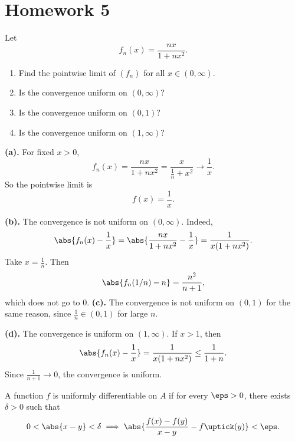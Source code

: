 
\section{Homework 5}

\begin{problem}[Exercise 6.2.1]{
    Let
    \[
        f_n(x)=\frac{nx}{1+nx^2}.
    \]
    \begin{enumerate}[label={(\alph*)}]
	\item Find the pointwise limit of $(f_n)$ for all $x\in(0,\infty)$.
    \item Is the convergence uniform on $(0,\infty)$?
    \item Is the convergence uniform on $(0,1)$?
    \item Is the convergence uniform on $(1,\infty)$?
    \end{enumerate}
}
    \textbf{(a).}
    For fixed $x>0$,
    \[
        f_n(x)=\frac{nx}{1+nx^2}
        =
        \frac{x}{\frac1n+x^2}
        \to \frac{1}{x}.
    \]
    So the pointwise limit is
    \[
        f(x)=\frac1x.
    \]

    \textbf{(b).}
    The convergence is not uniform on $(0,\infty)$.
    Indeed,
    \[
        \abs{f_n(x)-\frac1x}
        =
        \abs{\frac{nx}{1+nx^2}-\frac1x}
        =
        \frac{1}{x(1+nx^2)}.
    \]
    Take $x=\frac1n$.
    Then
    \[
        \abs{f_n(1/n)-n}
        =
        \frac{n^2}{n+1},
    \]
    which does not go to $0$.
    \textbf{(c).}
    The convergence is not uniform on $(0,1)$ for the same reason, since $\frac1n\in(0,1)$ for large $n$.

    \textbf{(d).}
    The convergence is uniform on $(1,\infty)$.
    If $x>1$, then
    \[
        \abs{f_n(x)-\frac1x}
        =
        \frac{1}{x(1+nx^2)}
        \leq
        \frac{1}{1+n}.
    \]
    Since $\frac{1}{n+1}\to 0$, the convergence is uniform.
\end{problem}

\begin{definition}
    A function $f$ is uniformly differentiable on $A$ if for every $\eps > 0$, there exists $\delta > 0$ such that
    \[
        0<\abs{x-y}<\delta
        \implies
        \abs{\frac{f(x)-f(y)}{x-y}-f\uptick(y)}<\eps.
    \]
\end{definition}

